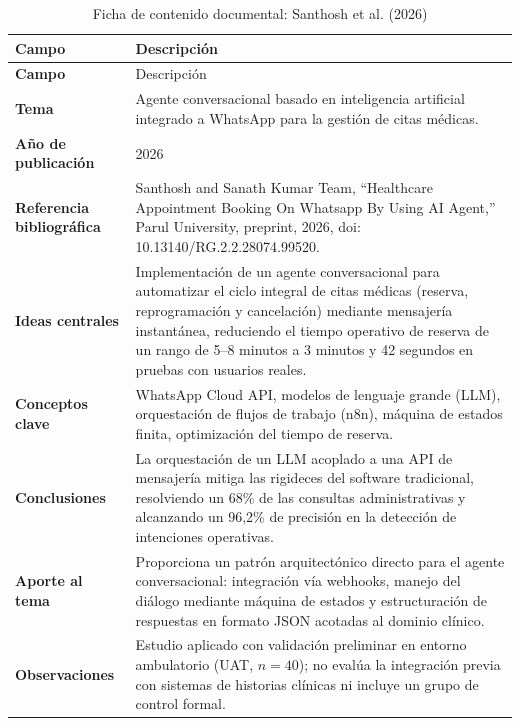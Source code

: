 \begin{longtable}{|>{\bfseries}p{4cm}|p{\dimexpr\linewidth-4cm-4\tabcolsep-4\arrayrulewidth\relax}|}
\caption{Ficha de contenido documental: Santhosh et al. (2026)}
\label{tab:ficha_santhosh_2026} \\
\hline
Campo & Descripción \\ \hline
\endfirsthead
\hline
Campo & Descripción \\ \hline
\endhead
\hline
\endfoot
Tema & Agente conversacional basado en inteligencia artificial integrado a WhatsApp para la gestión de citas médicas. \\ \hline
Año de publicación & 2026 \\ \hline
Referencia bibliográfica & Santhosh and Sanath Kumar Team, ``Healthcare Appointment Booking On Whatsapp By Using AI Agent,'' Parul University, preprint, 2026, doi: 10.13140/RG.2.2.28074.99520. \\ \hline
Ideas centrales & Implementación de un agente conversacional para automatizar el ciclo integral de citas médicas (reserva, reprogramación y cancelación) mediante mensajería instantánea, reduciendo el tiempo operativo de reserva de un rango de 5--8 minutos a 3 minutos y 42 segundos en pruebas con usuarios reales. \\ \hline
Conceptos clave & WhatsApp Cloud API, modelos de lenguaje grande (LLM), orquestación de flujos de trabajo (n8n), máquina de estados finita, optimización del tiempo de reserva. \\ \hline
Conclusiones & La orquestación de un LLM acoplado a una API de mensajería mitiga las rigideces del software tradicional, resolviendo un 68\% de las consultas administrativas y alcanzando un 96{,}2\% de precisión en la detección de intenciones operativas. \\ \hline
Aporte al tema & Proporciona un patrón arquitectónico directo para el agente conversacional: integración vía webhooks, manejo del diálogo mediante máquina de estados y estructuración de respuestas en formato JSON acotadas al dominio clínico. \\ \hline
Observaciones & Estudio aplicado con validación preliminar en entorno ambulatorio (UAT, $n = 40$); no evalúa la integración previa con sistemas de historias clínicas ni incluye un grupo de control formal. \\ \hline
\end{longtable}

\endgroup
